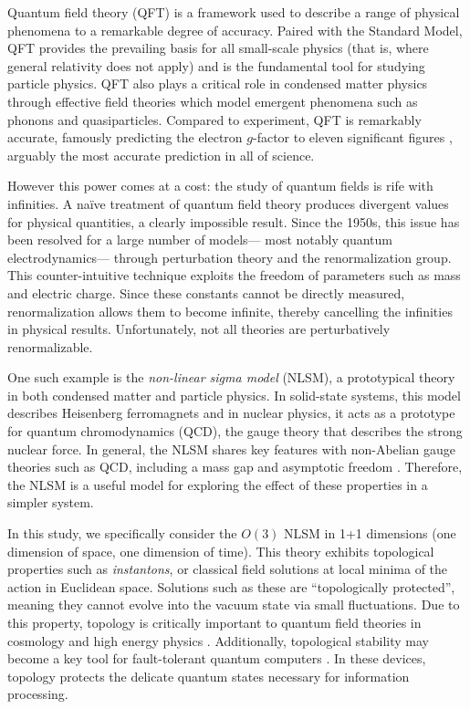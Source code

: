 Quantum field theory (QFT) is a framework used to describe a range of physical phenomena to a remarkable degree of accuracy. Paired with the Standard Model, QFT provides the prevailing basis for all small-scale physics (that is, where general relativity does not apply) and is the fundamental tool for studying particle physics. QFT also plays a critical role in condensed matter physics through effective field theories which model emergent phenomena such as phonons and quasiparticles. Compared to experiment, QFT is remarkably accurate, famously predicting the electron $g$-factor to eleven significant figures \cite{odom2006}, arguably the most accurate prediction in all of science.

However this power comes at a cost: the study of quantum fields is rife with infinities. A na\"ive treatment of quantum field theory produces divergent values for physical quantities, a clearly impossible result. Since the 1950s, this issue has been resolved for a large number of models--- most notably quantum electrodynamics--- through perturbation theory and the renormalization group. This counter-intuitive technique exploits the freedom of parameters such as mass and electric charge. Since these constants cannot be directly measured, renormalization allows them to become infinite, thereby cancelling the infinities in physical results. Unfortunately, not all theories are perturbatively renormalizable. 

One such example is the \textit{non-linear sigma model} (NLSM), a prototypical theory in both condensed matter and particle physics. In solid-state systems, this model describes Heisenberg ferromagnets \cite{callan1985} and in nuclear physics, it acts as a prototype for quantum chromodynamics (QCD), the gauge theory that describes the strong nuclear force. In general, the NLSM shares key features with non-Abelian gauge theories such as QCD, including a mass gap and asymptotic freedom \cite{polyakov1975}. Therefore, the NLSM is a useful model for exploring the effect of these properties in a simpler system.

In this study, we specifically consider the $O(3)$ NLSM in 1+1 dimensions (one dimension of space, one dimension of time). This theory exhibits topological properties such as \textit{instantons}, or classical field solutions at local minima of the action in Euclidean space. Solutions such as these are ``topologically protected'', meaning they cannot evolve into the vacuum state via small fluctuations. Due to this property, topology is critically important to quantum field theories in cosmology and high energy physics \cite{goddard1986}. Additionally, topological stability may become a key tool for fault-tolerant quantum computers \cite{kitaev1997}. In these devices, topology protects the delicate quantum states necessary for information processing.


